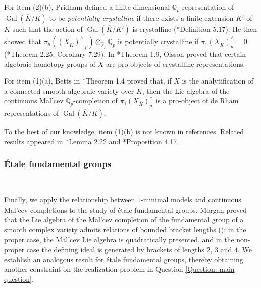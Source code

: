 \documentclass[11pt]{amsart}
\theoremstyle{definition}
\numberwithin{equation}{section}
\numberwithin{equation}{section}
\newcommand\QQ{\mathbb{Q}}
\newcommand\ZZ{\mathbb{Z}}
\DeclareMathOperator{\et}{\acute{e}t}
\DeclareMathOperator{\Gal}{Gal}
\begin{document}
For item (2)(b), Pridham defined a finite-dimensional $\QQ_p$-representation of $\Gal(\overline{K}/K)$ to be \textit{potentially crystalline} if there exists a finite extension $K'$ of $K$ such that the action of $\Gal(\overline{K}/K')$ is crystalline (\cite{Pridham-Galois-actions-on-homotopy-groups-algebraic-varieties}*{Definition 5.17}). He then showed that $\pi_n((X_{\overline{K}})^{\wedge}_{\et,p})\otimes_{\widehat{\ZZ}_{p}}\QQ_{p}$ is potentially crystalline if $\pi^{\et}_1(X_{\overline{K}})^{\wedge}_{p}=0$ (\cite{Pridham-Galois-actions-on-homotopy-groups-algebraic-varieties}*{Theorem 2.25, Corollary 7.29}). In \cite{Olsson-p-adic-hodge}*{Theorem 1.9}, Olsson proved that certain algebraic homotopy groups of $X$ are pro-objects of crystalline representations.

For item (1)(a), Betts in \cite{Betts-de-Rham}*{Theorem 1.4} proved that, if $X$ is the analytification of a connected smooth algebraic variety over $K$, then the Lie algebra of the continuous Mal'cev $\QQ_p$-completion of $\pi^{\et}_1(X_{\overline{K}})^{\wedge}_{p}$ is a pro-object of de Rham representations of $\Gal(\overline{K}/K)$.

To the best of our knowledge, item (1)(b) is not known in references. Related results appeared in \cite{Deglise-niziol-p-adic-hodge}*{Lemma 2.22} and \cite{Petrov-Zavyalov-formality-rigid-analytic}*{Proposition 4.17}. 

\subsubsection*{\underline{\'Etale fundamental groups}}\,

Finally, we apply the relationship between $1$-minimal models and continuous Mal'cev completions to the study of \'etale fundamental groups. Morgan proved that the Lie algebra of the Mal'cev completion of the fundamental group of a smooth complex variety admits relations of bounded bracket lengths (\cite{Morgan-hodge-theory}): in the proper case, the Mal'cev Lie algebra is quadratically presented, and in the non-proper case the defining ideal is generated by brackets of lengths $2$, $3$ and $4$. We establish an analogous result for \'etale fundamental groups, thereby obtaining another constraint on the realization problem in Question \ref{Question: main question}.
\end{document}
